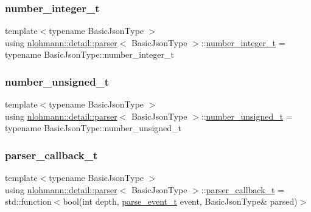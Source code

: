 \subsubsection{\texorpdfstring{number\+\_\+integer\+\_\+t}{number\_integer\_t}}
{\footnotesize\ttfamily template$<$typename Basic\+Json\+Type $>$ \\
using \hyperlink{classnlohmann_1_1detail_1_1parser}{nlohmann\+::detail\+::parser}$<$ Basic\+Json\+Type $>$\+::\hyperlink{classnlohmann_1_1detail_1_1parser_aa0362897269e0a7e50ae07be05f42d8e}{number\+\_\+integer\+\_\+t} =  typename Basic\+Json\+Type\+::number\+\_\+integer\+\_\+t\hspace{0.3cm}{\ttfamily [private]}}

\mbox{\label{classnlohmann_1_1detail_1_1parser_a3773ccef366c61da2e6a8c0eda36d0ec}} 
\subsubsection{\texorpdfstring{number\+\_\+unsigned\+\_\+t}{number\_unsigned\_t}}
{\footnotesize\ttfamily template$<$typename Basic\+Json\+Type $>$ \\
using \hyperlink{classnlohmann_1_1detail_1_1parser}{nlohmann\+::detail\+::parser}$<$ Basic\+Json\+Type $>$\+::\hyperlink{classnlohmann_1_1detail_1_1parser_a3773ccef366c61da2e6a8c0eda36d0ec}{number\+\_\+unsigned\+\_\+t} =  typename Basic\+Json\+Type\+::number\+\_\+unsigned\+\_\+t\hspace{0.3cm}{\ttfamily [private]}}

\mbox{\label{classnlohmann_1_1detail_1_1parser_ad250ad4f2b4af4a497e727c963162ff1}} 
\subsubsection{\texorpdfstring{parser\+\_\+callback\+\_\+t}{parser\_callback\_t}}
{\footnotesize\ttfamily template$<$typename Basic\+Json\+Type $>$ \\
using \hyperlink{classnlohmann_1_1detail_1_1parser}{nlohmann\+::detail\+::parser}$<$ Basic\+Json\+Type $>$\+::\hyperlink{classnlohmann_1_1detail_1_1parser_ad250ad4f2b4af4a497e727c963162ff1}{parser\+\_\+callback\+\_\+t} =  std\+::function$<$bool(int depth, \hyperlink{classnlohmann_1_1detail_1_1parser_a37ac88c864dda495f72cb62776b0bebe}{parse\+\_\+event\+\_\+t} event, Basic\+Json\+Type\& parsed)$>$}

